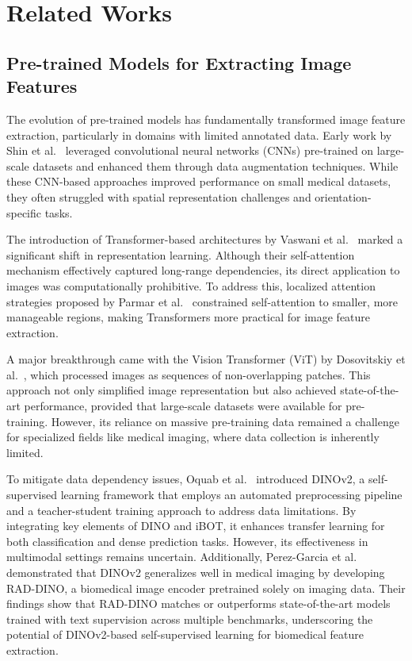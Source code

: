 \section{Related Works}
\label{II}

\subsection{Pre-trained Models for Extracting Image Features}

The evolution of pre-trained models has fundamentally transformed image feature extraction, particularly in domains with limited annotated data. Early work by Shin et al.~\cite{shin2016MedImg} leveraged convolutional neural networks (CNNs) pre-trained on large-scale datasets and enhanced them through data augmentation techniques. While these CNN-based approaches improved performance on small medical datasets, they often struggled with spatial representation challenges and orientation-specific tasks.  

The introduction of Transformer-based architectures by Vaswani et al.~\cite{vaswani2017attention} marked a significant shift in representation learning. Although their self-attention mechanism effectively captured long-range dependencies, its direct application to images was computationally prohibitive. To address this, localized attention strategies proposed by Parmar et al.~\cite{parmar2018image} constrained self-attention to smaller, more manageable regions, making Transformers more practical for image feature extraction.  

A major breakthrough came with the Vision Transformer (ViT) by Dosovitskiy et al.~\cite{dosovitskiy2020image}, which processed images as sequences of non-overlapping patches. This approach not only simplified image representation but also achieved state-of-the-art performance, provided that large-scale datasets were available for pre-training. However, its reliance on massive pre-training data remained a challenge for specialized fields like medical imaging, where data collection is inherently limited.  


To mitigate data dependency issues, Oquab et al.~\cite{oquab2023dinov2} introduced DINOv2, a self-supervised learning framework that employs an automated preprocessing pipeline and a teacher-student training approach to address data limitations. By integrating key elements of DINO and iBOT, it enhances transfer learning for both classification and dense prediction tasks. However, its effectiveness in multimodal settings remains uncertain. Additionally, Perez-Garcia et al.~\cite{pérez2025DINO} demonstrated that DINOv2 generalizes well in medical imaging by developing RAD-DINO, a biomedical image encoder pretrained solely on imaging data. Their findings show that RAD-DINO matches or outperforms state-of-the-art models trained with text supervision across multiple benchmarks, underscoring the potential of DINOv2-based self-supervised learning for biomedical feature extraction.

